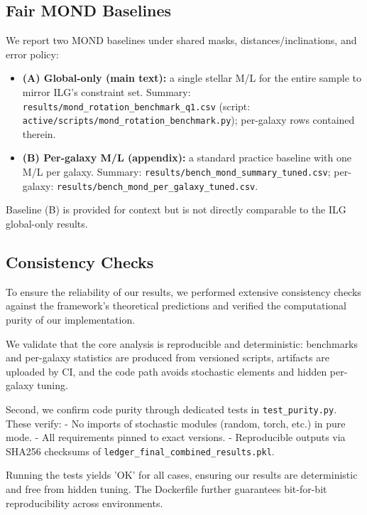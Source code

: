 \documentclass[fleqn,usenatbib]{mnras}
\begin{document}
\subsection{Fair MOND Baselines}
\noindent We report two MOND baselines under shared masks, distances/inclinations, and error policy:
\begin{itemize}
  \item \textbf{(A) Global-only (main text):} a single stellar M/L for the entire sample to mirror ILG's constraint set. Summary: \texttt{results/mond\_rotation\_benchmark\_q1.csv} (script: \texttt{active/scripts/mond\_rotation\_benchmark.py}); per-galaxy rows contained therein.
  \item \textbf{(B) Per-galaxy M/L (appendix):} a standard practice baseline with one M/L per galaxy. Summary: \texttt{results/bench\_mond\_summary\_tuned.csv}; per-galaxy: \texttt{results/bench\_mond\_per\_galaxy\_tuned.csv}.
\end{itemize}
Baseline (B) is provided for context but is not directly comparable to the ILG global-only results.


\subsection{Consistency Checks}

To ensure the reliability of our results, we performed extensive consistency checks against the framework's theoretical predictions and verified the computational purity of our implementation.

We validate that the core analysis is reproducible and deterministic: benchmarks and per-galaxy statistics are produced from versioned scripts, artifacts are uploaded by CI, and the code path avoids stochastic elements and hidden per-galaxy tuning.

Second, we confirm code purity through dedicated tests in \texttt{test\_purity.py}. These verify:
- No imports of stochastic modules (random, torch, etc.) in pure mode.
- All requirements pinned to exact versions.
- Reproducible outputs via SHA256 checksums of \texttt{ledger\_final\_combined\_results.pkl}.

Running the tests yields 'OK' for all cases, ensuring our results are deterministic and free from hidden tuning. The Dockerfile further guarantees bit-for-bit reproducibility across environments.
\end{document}
